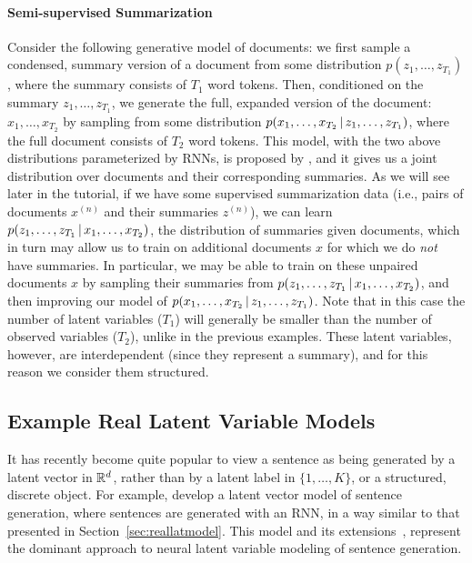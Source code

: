 \documentclass{article}
\begin{document}
\paragraph{Semi-supervised Summarization}
Consider the following generative model of documents: we first sample a condensed, summary version of a document from some distribution $p(z_1, \ldots, z_{T_1})$, where the summary consists of $T_1$ word tokens. Then, conditioned on the summary $z_1, \ldots, z_{T_1}$, we generate the full, expanded version of the document: $x_1, \ldots, x_{T_2}$ by sampling from some distribution $p(x_1, \ldots, x_{T_2} \,|\, z_1, \ldots, z_{T_1})$, where the full document consists of $T_2$ word tokens. This model, with the two above distributions parameterized by RNNs, is proposed by \citet{miao2016language}, and it gives us a joint distribution over documents and their corresponding summaries. As we will see later in the tutorial, if we have some supervised summarization data (i.e., pairs of documents $x^{(n)}$ and their summaries $z^{(n)}$), we can learn $p(z_1, \ldots, z_{T_1} \,|\, x_1, \ldots, x_{T_2})$, the distribution of summaries given documents, which in turn may allow us to train on additional documents $x$ for which we do \textit{not} have summaries. In particular, we may be able to train on these unpaired documents $x$ by sampling their summaries from $p(z_1, \ldots, z_{T_1} \,|\, x_1, \ldots, x_{T_2})$, and then improving our model of $p(x_1, \ldots, x_{T_2} \,|\, z_1, \ldots, z_{T_1})$. Note that in this case the number of latent variables ($T_1$) will generally be smaller than the number of observed variables ($T_2$), unlike in the previous examples. These latent variables, however, are interdependent (since they represent a summary), and for this reason we consider them structured.



\subsection{Example Real Latent Variable Models}
It has recently become quite popular to view a sentence as being generated by a latent vector in $\mathbb{R}^d$, rather than by a latent label in $\{1, \ldots, K\}$, or a structured, discrete object. For example, \citet{Bowman2016} develop a latent vector model of sentence generation, where sentences are generated with an RNN, in a way similar to that presented in Section~\ref{sec:reallatmodel}. This model and its extensions~\citep{Yang2017,hu2017toward,Kim2018}, represent the dominant approach to neural latent variable modeling of sentence generation. 
\end{document}
